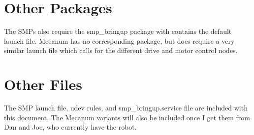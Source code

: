 \section{Other Packages}

The SMPs also require the smp\_bringup package with contains the default launch file. Mecanum has no corresponding package, but does require a very similar launch file which calls for the different drive and motor control nodes.

\section{Other Files}

The SMP launch file, udev rules, and smp\_bringup.service file are included with this document. The Mecanum variants will also be included once I get them from Dan and Joe, who currently have the robot.

